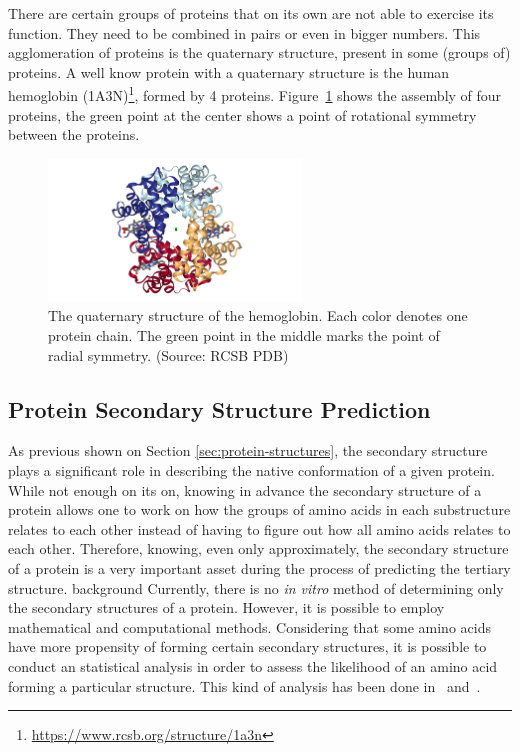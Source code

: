 
There are certain groups of proteins that on its own are not able to exercise
its function. They need to be combined in pairs or even in bigger numbers. This
agglomeration of proteins is the quaternary structure, present in some (groups
of) proteins. A well know protein with a quaternary structure is the human
hemoglobin (1A3N)\footnote{\url{https://www.rcsb.org/structure/1a3n}}, formed
by 4 proteins. Figure~\ref{fig:human-hemoglobin} shows the assembly of four
proteins, the green point at the center shows a point of rotational symmetry
between the proteins.

\begin{figure}
    \centering
    \includegraphics[width=0.6\textwidth]{Figuras/1a3n.png}
    \caption{The quaternary structure of the hemoglobin. Each color denotes one protein chain. The green point in the middle marks the point of radial symmetry. (Source: RCSB PDB)}
    \label{fig:human-hemoglobin}
\end{figure}

\subsection{Protein Secondary Structure Prediction}
\label{sec:secondary-structure-prediction}

As previous shown on Section \ref{sec:protein-structures}, the secondary
structure plays a significant role in describing the native conformation of a
given protein. While not enough on its on, knowing in advance the secondary
structure of a protein allows one to work on how the groups of amino acids in
each substructure relates to each other instead of having to figure out how all
amino acids relates to each other. Therefore, knowing, even only approximately,
the secondary structure of a protein is a very important asset during the
process of predicting the tertiary structure.
background
Currently, there is no \textit{in vitro} method of determining only the
secondary structures of a protein. However, it is possible to employ
mathematical and computational methods. Considering that some amino acids have
more propensity of forming certain secondary structures, it is possible to
conduct an statistical analysis in order to assess the likelihood of an amino
acid forming a particular structure. This kind of analysis has been done
in~\cite{dunbrack1993backbone} and~\cite{borguesan2015apl}.

